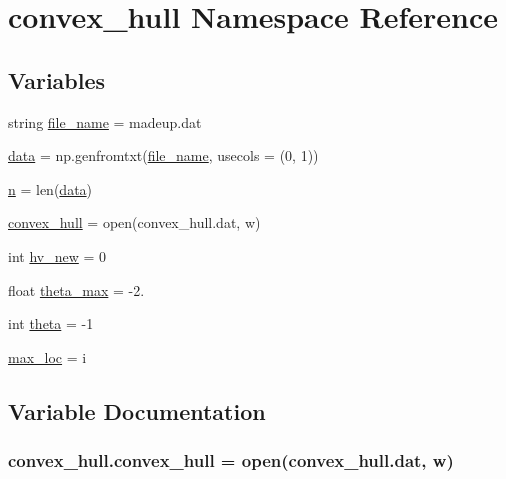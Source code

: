 \hypertarget{namespaceconvex__hull}{}\section{convex\+\_\+hull Namespace Reference}
\label{namespaceconvex__hull}
\subsection*{Variables}
\begin{DoxyCompactItemize}
\item 
string \hyperlink{namespaceconvex__hull_ad291c7409f15a506c77ae148338af0d1}{file\+\_\+name} = \textquotesingle{}madeup.\+dat\textquotesingle{}
\item 
\hyperlink{namespaceconvex__hull_afa0c802ef5d11349c9b0ae812a687963}{data} = np.\+genfromtxt(\hyperlink{namespaceconvex__hull_ad291c7409f15a506c77ae148338af0d1}{file\+\_\+name}, usecols = (0, 1))
\item 
\hyperlink{namespaceconvex__hull_ac5465861527a4ef8e879c3a49cbd8766}{n} = len(\hyperlink{namespaceconvex__hull_afa0c802ef5d11349c9b0ae812a687963}{data})
\item 
\hyperlink{namespaceconvex__hull_af3fcaac35df98214a8c71ed65c6863af}{convex\+\_\+hull} = open(\textquotesingle{}convex\+\_\+hull.\+dat\textquotesingle{}, \textquotesingle{}w\textquotesingle{})
\item 
int \hyperlink{namespaceconvex__hull_af248f2a2b3bdf6275178a4d6003241a4}{hv\+\_\+new} = 0
\item 
float \hyperlink{namespaceconvex__hull_a4611cf1c26d3efe788cd6e21b786cd0c}{theta\+\_\+max} = -\/2.
\item 
int \hyperlink{namespaceconvex__hull_ab8272752257e642cd8986e8d229cfea8}{theta} = -\/1
\item 
\hyperlink{namespaceconvex__hull_a8e865a90a6ebc2332e166f698bb2b889}{max\+\_\+loc} = i
\end{DoxyCompactItemize}


\subsection{Variable Documentation}
\subsubsection[{\texorpdfstring{convex\+\_\+hull}{convex_hull}}]{\setlength{\rightskip}{0pt plus 5cm}convex\+\_\+hull.\+convex\+\_\+hull = open(\textquotesingle{}convex\+\_\+hull.\+dat\textquotesingle{}, \textquotesingle{}w\textquotesingle{})}\hypertarget{namespaceconvex__hull_af3fcaac35df98214a8c71ed65c6863af}{}\label{namespaceconvex__hull_af3fcaac35df98214a8c71ed65c6863af}


